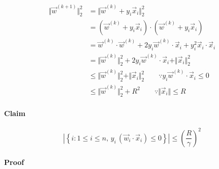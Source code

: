 \begin{align*}
\Vert\vec{w}^{(k+1)}\Vert_{2}^{2} & =\Vert\vec{w}^{(k)}+y_{i}\vec{x}_{i}\Vert_{2}^{2}\\
 & =\left(\vec{w}^{(k)}+y_{i}\vec{x}_{i}\right)\cdot\left(\vec{w}^{(k)}+y_{i}\vec{x}_{i}\right)\\
 & =\vec{w}^{(k)}\cdot\vec{w}^{(k)}+2y_{i}\vec{w}^{(k)}\cdot\vec{x}_{i}+y_{i}^{2}\vec{x}_{i}\cdot\vec{x}_{i}\\
 & =\Vert\vec{w}^{(k)}\Vert_{2}^{2}+2y_{i}\vec{w}^{(k)}\cdot\vec{x}_{i}+\Vert\vec{x}_{i}\Vert_{2}^{2}\\
 & \leq\Vert\vec{w}^{(k)}\Vert_{2}^{2}+\Vert\vec{x}_{i}\Vert_{2}^{2}\qquad\because y_{i}\vec{w}^{(k)}\cdot\vec{x}_{i}\leq0\\
 & \leq\Vert\vec{w}^{(k)}\Vert_{2}^{2}+R^{2}\qquad\because\Vert\vec{x}_{i}\Vert\leq R
\end{align*}



\paragraph*{Claim}

\[
\left|\left\{ i:1\le i\le n,\, y_{i}\,(\vec{w}_{i}\cdot\vec{x}_{i})\leq0\right\} \right|\leq\left(\frac{R}{\gamma}\right)^{2}
\]



\paragraph*{Proof}